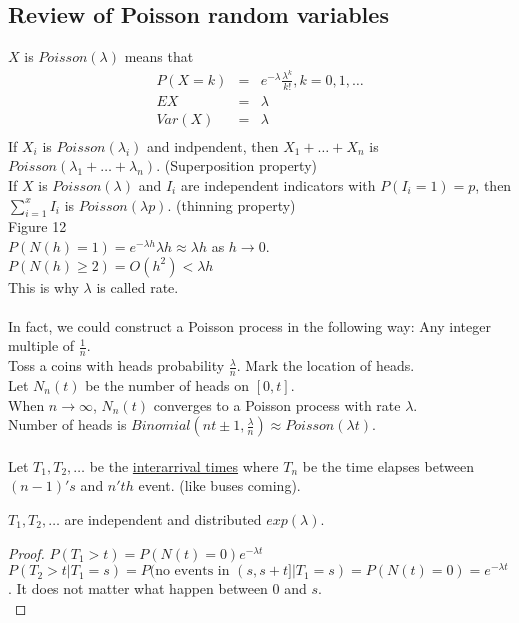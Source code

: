   \subsection*{Review of Poisson random variables}
    $X$ is $Poisson(\lambda)$ means that 
    \begin{eqnarray*}
      P(X = k) & = & e^{-\lambda}\frac{\lambda^k}{k!}, k = 0, 1, \ldots\\
      EX & = & \lambda\\
      Var(X) & = & \lambda\\
    \end{eqnarray*}
    If $X_i$ is $Poisson(\lambda_i)$ and indpendent, then $X_1 + \ldots + X_n$ is
      $Poisson(\lambda_1 + \ldots + \lambda_n)$. (Superposition property)\\
    If $X$ is $Poisson(\lambda)$ and $I_i$ are independent indicators with $P(I_i
      = 1) = p$, then $\sum_{i = 1}^x I_i$ is $Poisson(\lambda p)$. (thinning 
      property)\\
    Figure 12\\
    $P(N(h) = 1) = e^{-\lambda h} \lambda h \approx \lambda h$ as $h \to 0$.\\
    $P(N(h) \ge 2) = O(h^2) < \lambda h$\\
    This is why $\lambda$ is called rate.\\\\
    In fact, we could construct a Poisson process in the following way: Any integer
    multiple of $\frac{1}{n}$.\\
    Toss a coins with heads probability $\frac{\lambda}{n}$. Mark the location of heads.\\
    Let $N_n(t)$ be the number of heads on $[0, t]$.\\
    When $n \to \infty$, $N_n(t)$ converges to a Poisson process with rate $\lambda$.\\
    Number of heads is $Binomial(nt \pm 1, \frac{\lambda}{n}) \approx Poisson(\lambda t)$.\\\\
    
    \noindent Let $T_1, T_2, \ldots$ be the \underline{interarrival times} where $T_n$ be the
    time elapses between $(n-1)'s$ and $n'th$ event. (like buses coming).\\
    \begin{proposition}
      $T_1, T_2, \ldots$ are independent and distributed $exp(\lambda)$.
    \end{proposition}
    \begin{proof}
      $P(T_1 > t) = P(N(t) = 0) e^{-\lambda t}$\\
      $P(T_2 > t | T_1 = s) = P(\text{no events in }(s, s + t] | T_1 = s) = 
      P(N(t) = 0) = e^{-\lambda t}$. It does not matter what happen between 
      0 and $s$.\\
    \end{proof}
